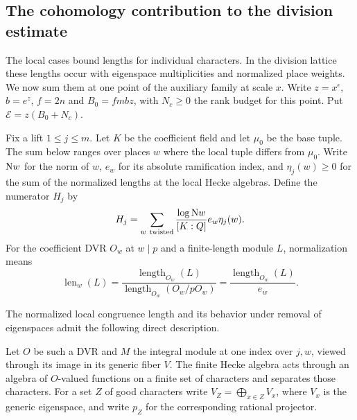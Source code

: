 \subsection{The cohomology contribution to the division estimate}
\label{subsec:division-length}
\hypertarget{source-division-length}{}

The local cases bound lengths for individual characters. In the division lattice these lengths occur with eigenspace multiplicities and normalized place weights. We now sum them at one point of the auxiliary family at scale \(x\). Write \(z=x^\epsilon\),
\(b=e^z\), \(f=2n\) and \(B_0=fmbz\), with \(N_c\ge0\) the rank
budget for this point. Put \(\mathcal E=z(B_0+N_c)\).
\begin{definition}\label{def:weighted-congruence-numerator}
Fix a lift \(1\le j\le m\). Let \(K\) be the coefficient field
and let \(\mu_0\) be the base tuple. The sum below ranges over
places \(w\) where the local tuple differs from \(\mu_0\).
Write \({\rm N}w\) for the norm of \(w\), \(e_w\) for its
absolute ramification index, and \(\eta_j(w)\ge0\) for the sum
of the normalized lengths at the local Hecke algebras.
Define the numerator \(H_j\) by
\[
 H_j=\sum_{w\ {\rm twisted}}
       \frac{\log {\rm N}w}{[K:\mathbb Q]} e_w\eta_j(w).
\]
For the coefficient DVR \(O_w\) at \(w\mid p\) and a finite-length module \(L\), normalization means
\[
 \operatorname{len}_w(L)=\frac{\operatorname{length}_{O_w}(L)}
 {\operatorname{length}_{O_w}(O_w/pO_w)}
 =\frac{\operatorname{length}_{O_w}(L)}{e_w}.
\]
\end{definition}
The normalized local congruence length and its behavior under
removal of eigenspaces admit the following direct description.

Let \(O\) be such a DVR and \(M\) the integral module at one index
over \(j,w\), viewed through its image in its generic fiber \(V\).
The finite Hecke algebra acts through an algebra of \(O\)-valued
functions on a finite set of characters and separates those characters.
For a set \(Z\) of good characters write \(V_Z=\bigoplus_{x\in Z}V_x\),
where \(V_x\) is the generic eigenspace, and write \(p_Z\) for the
corresponding rational projector.

